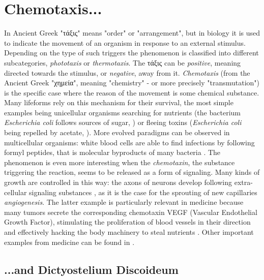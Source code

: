 \section{Chemotaxis...}

In Ancient Greek "τάξις" means "order" or "arrangement", but in biology it is used to indicate the movement of an organism in response to an external stimulus.
Depending on the type of such triggers the phenomenon is classified into different subcategories, \eg \emph{phototaxis} or \emph{thermotaxis}.
The τάξις can be \emph{positive}, meaning directed towards the stimulus, or \emph{negative}, away from it.
\emph{Chemotaxis} (from the Ancient Greek "χημεία", meaning "chemistry" - or more precisely "transmutation") is the specific case where the reason of the movement is some chemical substance.
Many lifeforms rely on this mechanism for their survival, the most simple examples being unicellular organisms searching for nutrients (\eg the bacterium \emph{Escherichia coli} follows sources of sugar, \cite{ct-ecoli-glucose}) or fleeing toxins (\eg \emph{Escherichia coli} being repelled by acetate, \cite{negative-chemotaxis}).
More evolved paradigms can be observed in multicellular organisms: white blood cells are able to find infections by following formyl peptides, that is molecular byproducts of many bacteria \cite{ct-immune-system}.
The phenomenon is even more interesting when the \emph{chemotaxin}, the substance triggering the reaction, seems to be released as a form of signaling.
Many kinds of growth are controlled in this way: the axons of neurons develop following extra-cellular signaling substances \cite{ct-axons-neurons}, as it is the case for the sprouting of new capillaries \emph{angiogenesis}.
The latter example is particularly relevant in medicine because many tumors secrete the corresponding chemotaxin VEGF (Vascular Endothelial Growth Factor), stimulating the proliferation of blood vessels in their direction and effectively hacking the body machinery to steal nutrients \cite{ct-cancer-angiogenesis}.
Other important examples from medicine can be found in \cite{ct-diseases}.

\subsection{...and Dictyostelium Discoideum}

